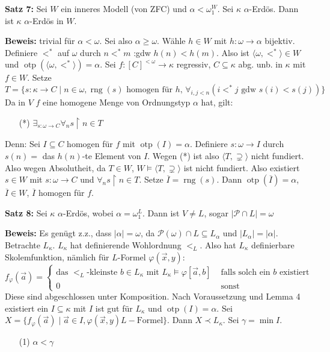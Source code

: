 \documentclass[a4paper,fontsize=11pt]{scrartcl}
\newcommand{\rng}{\operatorname{rng}}
\newcommand{\otp}{\operatorname{otp}}
\renewcommand{\bar}[1]{\overline{#1}}
\begin{document}
{\bf Satz 7:} Sei $W$ ein inneres Modell (von ZFC) %
  und $\alpha<\omega_1^{W}$.
  Sei $\kappa$ $\alpha$-Erdös.
  Dann ist $\kappa$ $\alpha$-Erdös in $W$.
  
  {\bf Beweis:} trivial für $\alpha<\omega$.
    Sei also $\alpha\ge\omega$.
    Wähle $h\in W$ mit $h\colon\omega\to\alpha$ bijektiv.
    Definiere $<^*$ auf $\omega$ durch $n<^*m$ :gdw $h(n)<h(m)$.
    Also ist $\langle\omega,<^*\rangle\in W$ und $\otp(\langle \omega,<^*\rangle)=\alpha$.
    Sei $f\colon [C]^{<\omega}\to\kappa$ regressiv, $C\subseteq \kappa$ abg. unb. in $\kappa$ mit $f\in W$.
    Setze $T=\{ s\colon\kappa\to C\mid n\in\omega, \rng(s)\mbox{ homogen für $h$, }\forall_{i,j<n}(i<^*j \mbox{ gdw } s(i)<s(j))\}$
    Da in $V$ $f$ eine homogene Menge von Ordnungstyp $\alpha$ hat, gilt:
    \begin{itemize}\item[(*)] $\exists_{s\colon\omega\to C} \forall_n s\upharpoonright n\in T$\end{itemize}
    Denn: Sei $I\subseteq C$ homogen für $f$ mit $\otp(I)=\alpha$.
    Definiere $s\colon\omega\to I$ durch $s(n)=$ das $h(n)$-te Element von $I$.
    Wegen (*) ist also $\langle T,\supsetneq\rangle$ nicht fundiert.
    Also wegen Absolutheit, da $T\in W$, $W\models \langle T,\supsetneq\rangle$ ist nicht fundiert.
    Also existiert $s\in W$ mit $s\colon \omega\to C$ und $\forall_n s\upharpoonright n\in T$.
    Setze $\bar I=\rng(s)$.
    Dann $\otp(\bar I)=\alpha$, $\bar I\in W$, $\bar I$ homogen für $f$.
    
{\bf Satz 8:} Sei $\kappa$ $\alpha$-Erdös, wobei $\alpha=\omega_1^L$.
  Dann ist $V\neq L$, sogar $|\mathcal P\cap L|=\omega$
    
  {\bf Beweis:} Es genügt z.z., dass $|\alpha|=\omega$, da $\mathcal P(\omega)\cap L\subseteq L_{\alpha}$ und $|L_{\alpha}|=|\alpha|$.
    Betrachte $L_{\kappa}$. 
    $L_{\kappa}$ hat definierende Wohlordnung $<_L$. 
    Also hat $L_{\kappa}$ definierbare Skolemfunktion, nämlich für $L$-Formel $\varphi(\vec x,y)$:
    \[  f_{\varphi}(\vec a)=\left\{\begin{array}{lr} \mbox{das $<_L$-kleinste $b\in L_{\kappa}$ mit $L_{\kappa}\models\varphi[\vec a,b]$} & \mbox{ falls solch ein $b$ existiert} \\ 0 & \mbox{ sonst}\end{array}\right. \]
    Diese sind abgeschlossen unter Komposition.
    Nach Voraussetzung und Lemma 4 existiert ein $I\subseteq\kappa$ mit $I$ ist gut für $L_{\kappa}$ und $\otp(I)=\alpha$.
    Sei $X=\{f_{\varphi}(\vec a)\mid \vec a\in I, \varphi(\vec x, y) L-\mbox{Formel}\}$.
    Dann $X\prec L_{\kappa}$.
    Sei $\gamma=\min I$.
    \begin{itemize}\item[(1)] $\alpha<\gamma$ \end{itemize}
    
\end{document}
